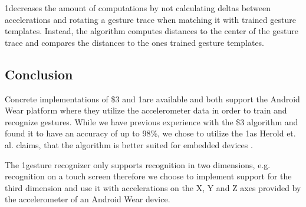 1\textcent decreases the amount of computations by not calculating deltas between accelerations and rotating a gesture trace when matching it with trained gesture templates. Instead, the algorithm computes distances to the center of the gesture trace and compares the distances to the ones trained gesture templates.

\subsection{Conclusion}

Concrete implementations of \$3 and 1\textcent are available and both support the Android Wear platform where they utilize the accelerometer data in order to train and recognize gestures. While we have previous experience with the \$3 algorithm and found it to have an accuracy of up to 98\%, we chose to utilize the 1\textcent as Herold et. al. claims, that the algorithm is better suited for embedded devices \cite{herold20121}.

The 1\textcent gesture recognizer only supports recognition in two dimensions, e.g. recognition on a touch screen therefore we choose to implement support for the third dimension and use it with accelerations on the X, Y and Z axes provided by the accelerometer of an Android Wear device.

